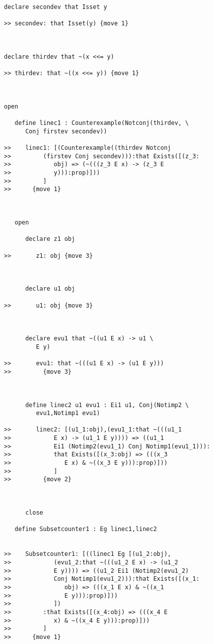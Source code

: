 \documentclass[12pt]{article}
\begin{document}
\begin{verbatim}
declare secondev that Isset y

>> secondev: that Isset(y) {move 1}



declare thirdev that ~(x <<= y)

>> thirdev: that ~((x <<= y)) {move 1}



open

   define linec1 : Counterexample(Notconj(thirdev, \
      Conj firstev secondev))

>>    linec1: [(Counterexample((thirdev Notconj
>>         (firstev Conj secondev))):that Exists([(z_3:
>>            obj) => (~(((z_3 E x) -> (z_3 E
>>            y))):prop)]))
>>         ]
>>      {move 1}



   open

      declare z1 obj

>>       z1: obj {move 3}



      declare u1 obj

>>       u1: obj {move 3}



      declare evu1 that ~((u1 E x) -> u1 \
         E y)

>>       evu1: that ~(((u1 E x) -> (u1 E y)))
>>         {move 3}



      define linec2 u1 evu1 : Ei1 u1, Conj(Notimp2 \
         evu1,Notimp1 evu1)

>>       linec2: [(u1_1:obj),(evu1_1:that ~(((u1_1
>>            E x) -> (u1_1 E y)))) => ((u1_1
>>            Ei1 (Notimp2(evu1_1) Conj Notimp1(evu1_1))):
>>            that Exists([(x_3:obj) => (((x_3
>>               E x) & ~((x_3 E y))):prop)]))
>>            ]
>>         {move 2}



      close

   define Subsetcounter1 : Eg linec1,linec2


>>    Subsetcounter1: [((linec1 Eg [(u1_2:obj),
>>            (evu1_2:that ~(((u1_2 E x) -> (u1_2
>>            E y)))) => ((u1_2 Ei1 (Notimp2(evu1_2)
>>            Conj Notimp1(evu1_2))):that Exists([(x_1:
>>               obj) => (((x_1 E x) & ~((x_1
>>               E y))):prop)]))
>>            ])
>>         :that Exists([(x_4:obj) => (((x_4 E
>>            x) & ~((x_4 E y))):prop)]))
>>         ]
>>      {move 1}




\end{verbatim}
\end{document}
